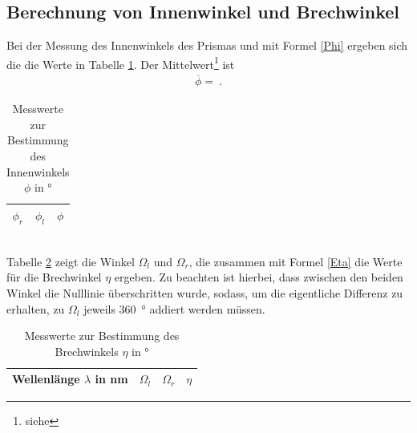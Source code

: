\subsection{Berechnung von Innenwinkel und Brechwinkel}
Bei der Messung des Innenwinkels des Prismas und mit Formel \eqref{Phi} ergeben sich die die Werte in Tabelle \ref{tab:WinkelPhi}. Der Mittelwert\footnote{siehe } ist
\begin{align}
	\overline{\phi} =  \ .
\end{align}
\begin{table}[h!]
	\centering	
	\begin{tabular}{c|c|c}
		$\phi_r$ & $\phi_l$ & $\phi$ \\
		\hline
		
	\end{tabular}
	\caption{Messwerte zur Bestimmung des Innenwinkels $\phi$ in \si{\degree}}
	\label{tab:WinkelPhi}
\end{table} \\
Tabelle \ref{tab:WinkelFarben} zeigt die Winkel $\Omega_l$ und $\Omega_r$, die zusammen mit Formel \eqref{Eta} die Werte für die Brechwinkel $\eta$ ergeben. Zu beachten ist hierbei, dass zwischen den beiden Winkel die Nulllinie überschritten wurde, sodass, um die eigentliche Differenz zu erhalten, zu $\Omega_l$ jeweils \SI{360}{\degree} addiert werden müssen.
\begin{table}[h!]
	\centering	
	\begin{tabular}{c|c|c|c}
		Wellenlänge $\lambda$ in \si{\nano\meter} & $\Omega_l$ & $\Omega_r$ & $\eta$ \\
		\hline
		
	\end{tabular}
	\caption{Messwerte zur Bestimmung des Brechwinkels $\eta$ in \si{\degree}}
	\label{tab:WinkelFarben}
\end{table}
\clearpage
